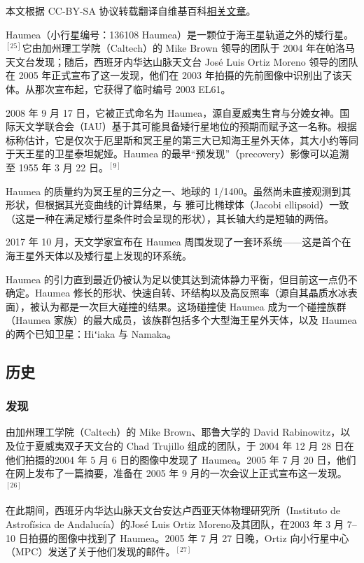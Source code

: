 
本文根据 CC-BY-SA 协议转载翻译自维基百科\href{https://en.wikipedia.org/wiki/Haumea}{相关文章}。

Haumea（小行星编号：136108 Haumea）是一颗位于海王星轨道之外的矮行星。$^{[25]}$它由加州理工学院（Caltech）的 Mike Brown 领导的团队于 2004 年在帕洛马天文台发现；随后，西班牙内华达山脉天文台 José Luis Ortiz Moreno 领导的团队在 2005 年正式宣布了这一发现，他们在 2003 年拍摄的先前图像中识别出了该天体。从那次宣布起，它获得了临时编号 2003 EL61。

2008 年 9 月 17 日，它被正式命名为 Haumea，源自夏威夷生育与分娩女神。国际天文学联合会（IAU）基于其可能具备矮行星地位的预期而赋予这一名称。根据标称估计，它是仅次于厄里斯和冥王星的第三大已知海王星外天体，其大小约等同于天王星的卫星泰坦妮娅。Haumea 的最早“预发现”（precovery）影像可以追溯至 1955 年 3 月 22 日。$^{[9]}$

Haumea 的质量约为冥王星的三分之一、地球的 1/1400。虽然尚未直接观测到其形状，但根据其光变曲线的计算结果，与 雅可比椭球体（Jacobi ellipsoid）一致（这是一种在满足矮行星条件时会呈现的形状），其长轴大约是短轴的两倍。

2017 年 10 月，天文学家宣布在 Haumea 周围发现了一套环系统——这是首个在海王星外天体以及矮行星上发现的环系统。

Haumea 的引力直到最近仍被认为足以使其达到流体静力平衡，但目前这一点仍不确定。Haumea 修长的形状、快速自转、环结构以及高反照率（源自其晶质水冰表面），被认为都是一次巨大碰撞的结果。这场碰撞使 Haumea 成为一个碰撞族群（Haumea 家族）的最大成员，该族群包括多个大型海王星外天体，以及 Haumea 的两个已知卫星：Hiʻiaka 与 Namaka。
\subsection{历史}
\subsubsection{发现}
由加州理工学院（Caltech）的 Mike Brown、耶鲁大学的 David Rabinowitz，以及位于夏威夷双子天文台的 Chad Trujillo 组成的团队，于 2004 年 12 月 28 日在他们拍摄的2004 年 5 月 6 日的图像中发现了 Haumea。2005 年 7 月 20 日，他们在网上发布了一篇摘要，准备在 2005 年 9 月的一次会议上正式宣布这一发现。$^{[26]}$

在此期间，西班牙内华达山脉天文台安达卢西亚天体物理研究所（Instituto de Astrofísica de Andalucía）的José Luis Ortiz Moreno及其团队，在2003 年 3 月 7–10 日拍摄的图像中找到了 Haumea。2005 年 7 月 27 日晚，Ortiz 向小行星中心（MPC）发送了关于他们发现的邮件。$^{[27]}$

